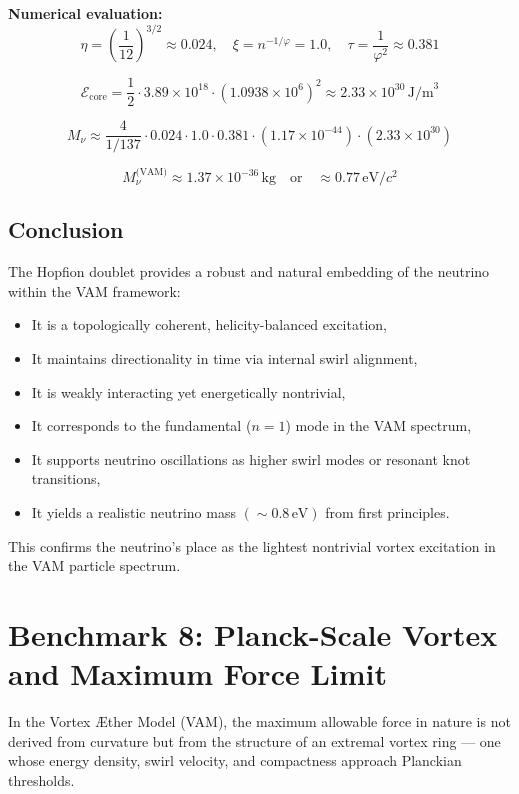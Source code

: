 \documentclass[preprint]{revtex4-2}
\begin{document}
\noindent
\textbf{Numerical evaluation:}
\[
\eta = \left( \frac{1}{12} \right)^{3/2} \approx 0.024, \quad
\xi = n^{-1/\varphi} = 1.0, \quad
\tau = \frac{1}{\varphi^2} \approx 0.381
\]

\[
\mathcal{E}_\text{core} = \frac{1}{2} \cdot 3.89 \times 10^{18} \cdot (1.0938 \times 10^6)^2 \approx 2.33 \times 10^{30} \, \text{J/m}^3
\]

\[
M_\nu \approx \frac{4}{1/137} \cdot 0.024 \cdot 1.0 \cdot 0.381 \cdot (1.17 \times 10^{-44}) \cdot (2.33 \times 10^{30})
\]

\[
\boxed{
M_\nu^\text{(VAM)} \approx 1.37 \times 10^{-36} \, \text{kg}
}
\quad \text{or} \quad
\boxed{
\approx 0.77 \, \text{eV}/c^2
}
\]

\subsection{Conclusion}

The Hopfion doublet provides a robust and natural embedding of the neutrino within the VAM framework:

\begin{itemize}
    \item It is a topologically coherent, helicity-balanced excitation,
    \item It maintains directionality in time via internal swirl alignment,
    \item It is weakly interacting yet energetically nontrivial,
    \item It corresponds to the fundamental (\(n = 1\)) mode in the VAM spectrum,
    \item It supports neutrino oscillations as higher swirl modes or resonant knot transitions,
    \item It yields a realistic neutrino mass \((\sim 0.8 \, \text{eV})\) from first principles.
\end{itemize}

This confirms the neutrino’s place as the lightest nontrivial vortex excitation in the VAM particle spectrum.
\section{Benchmark 8: Planck-Scale Vortex and Maximum Force Limit}

In the Vortex Æther Model (VAM), the maximum allowable force in nature is not derived from curvature but from the structure of an extremal vortex ring — one whose energy density, swirl velocity, and compactness approach Planckian thresholds.
\end{document}

